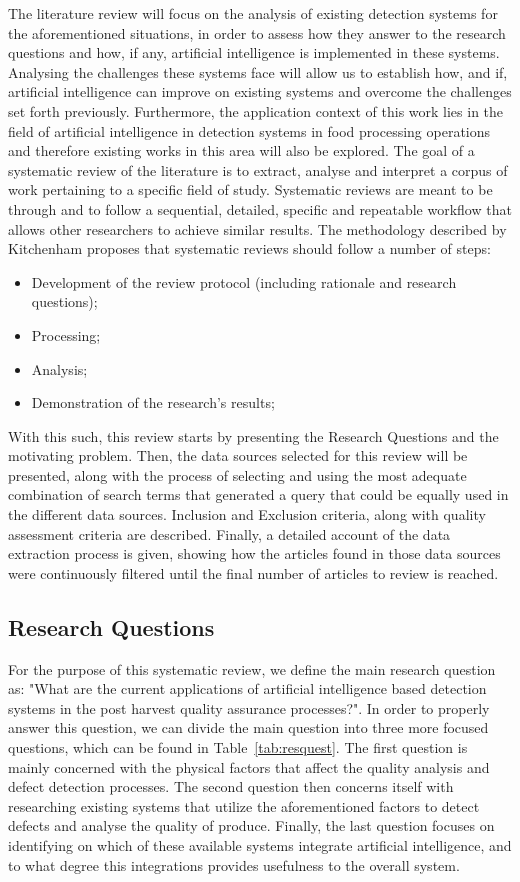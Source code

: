 \documentclass[conference]{IEEEtran}
\begin{document}
The literature review will focus on the analysis of existing detection systems for the aforementioned situations, in order to assess how they answer to the research questions and how, if any, artificial intelligence is implemented in these systems. Analysing the challenges these systems face will allow us to establish how, and if, artificial intelligence can improve on existing systems and overcome the challenges set forth previously. Furthermore, the application context of this work lies in the field of artificial intelligence in detection systems in food processing operations and therefore existing works in this area will also be explored.
The goal of a systematic review of the literature is to extract, analyse and interpret a corpus of work pertaining to a specific field of study. Systematic reviews are meant to be through and to follow a sequential, detailed, specific and repeatable workflow that allows other researchers to achieve similar results. The methodology described by Kitchenham \cite{kitch} proposes that systematic reviews should follow a number of steps:
\begin{itemize}
	\item Development of the review protocol (including rationale and research questions);
	\item Processing;
	\item Analysis;
	\item Demonstration of the research's results;
\end{itemize}
With this such, this review starts by presenting the Research Questions and the motivating problem. Then, the data sources selected for this review will be presented, along with the process of selecting and using the most adequate combination of search terms that generated a query that could be equally used in the different data sources. Inclusion and Exclusion criteria, along with quality assessment criteria are described. Finally, a detailed account of the data extraction process is given, showing how the articles found in those data sources were continuously filtered until the final number of articles to review is reached.

\subsection{Research Questions}

For the purpose of this systematic review, we define the main research question as: "What are the current applications of artificial intelligence based detection systems in the post harvest quality assurance processes?". In order to properly answer this question, we can divide the main question into three more focused questions, which can be found in Table~\ref{tab:resquest}. The first question is mainly concerned with the physical factors that affect the quality analysis and defect detection processes. The second question then concerns itself with researching existing systems that utilize the aforementioned factors to detect defects and analyse the quality of produce. Finally, the last question focuses on identifying on which of these available systems integrate artificial intelligence, and to what degree this integrations provides usefulness to the overall system.
\end{document}
